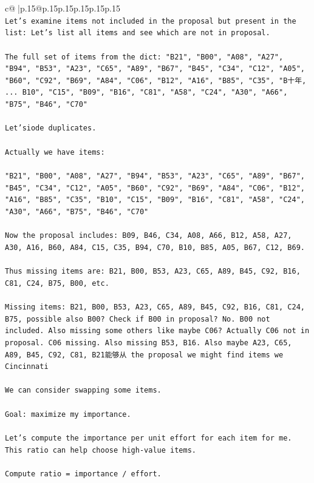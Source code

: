 \documentclass{article}
\begin{document}
{\begin{supertabular}{c@{$\;$}|p{.15\linewidth}@{}p{.15\linewidth}p{.15\linewidth}p{.15\linewidth}p{.15\linewidth}p{.15\linewidth}}
{{{\\ 
\texttt{Let's examine items not included in the proposal but present in the list: Let's list all items and see which are not in proposal.} \\
\\ 
\texttt{The full set of items from the dict: "B21", "B00", "A08", "A27", "B94", "B53", "A23", "C65", "A89", "B67", "B45", "C34", "C12", "A05", "B60", "C92", "B69", "A84", "C06", "B12", "A16", "B85", "C35", "B十年, ... B10", "C15", "B09", "B16", "C81", "A58", "C24", "A30", "A66", "B75", "B46", "C70"} \\
\\ 
\texttt{Let'siode duplicates.} \\
\\ 
\texttt{Actually we have items:} \\
\\ 
\texttt{"B21", "B00", "A08", "A27", "B94", "B53", "A23", "C65", "A89", "B67", "B45", "C34", "C12", "A05", "B60", "C92", "B69", "A84", "C06", "B12", "A16", "B85", "C35", "B10", "C15", "B09", "B16", "C81", "A58", "C24", "A30", "A66", "B75", "B46", "C70"} \\
\\ 
\texttt{Now the proposal includes: B09, B46, C34, A08, A66, B12, A58, A27, A30, A16, B60, A84, C15, C35, B94, C70, B10, B85, A05, B67, C12, B69.} \\
\\ 
\texttt{Thus missing items are: B21, B00, B53, A23, C65, A89, B45, C92, B16, C81, C24, B75, B00, etc.} \\
\\ 
\texttt{Missing items: B21, B00, B53, A23, C65, A89, B45, C92, B16, C81, C24, B75, possible also B00? Check if B00 in proposal? No. B00 not included. Also missing some others like maybe C06? Actually C06 not in proposal. C06 missing. Also missing B53, B16. Also maybe A23, C65, A89, B45, C92, C81, B21能够从 the proposal we might find items we Cincinnati} \\
\\ 
\texttt{We can consider swapping some items.} \\
\\ 
\texttt{Goal: maximize my importance.} \\
\\ 
\texttt{Let's compute the importance per unit effort for each item for me. This ratio can help choose high{-}value items.} \\
\\ 
\texttt{Compute ratio = importance / effort.} \\
}}}
\end{supertabular}}
\end{document}
